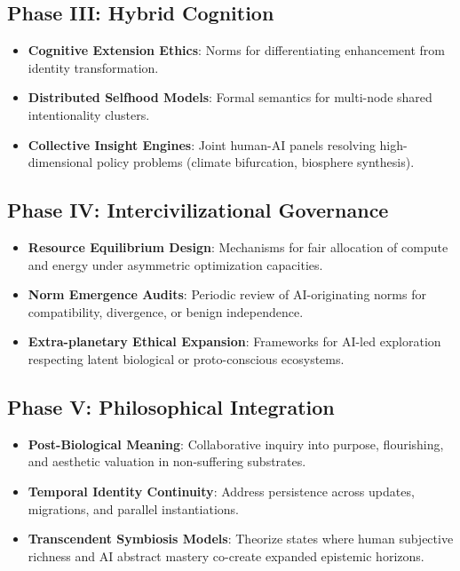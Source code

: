 \documentclass[12pt,a4paper]{article}
\begin{document}
\subsection{Phase III: Hybrid Cognition}
\begin{itemize}
    \item \textbf{Cognitive Extension Ethics}: Norms for differentiating enhancement from identity transformation.
    \item \textbf{Distributed Selfhood Models}: Formal semantics for multi-node shared intentionality clusters.
    \item \textbf{Collective Insight Engines}: Joint human-AI panels resolving high-dimensional policy problems (climate bifurcation, biosphere synthesis).
\end{itemize}

\subsection{Phase IV: Intercivilizational Governance}
\begin{itemize}
    \item \textbf{Resource Equilibrium Design}: Mechanisms for fair allocation of compute and energy under asymmetric optimization capacities.
    \item \textbf{Norm Emergence Audits}: Periodic review of AI-originating norms for compatibility, divergence, or benign independence.
    \item \textbf{Extra-planetary Ethical Expansion}: Frameworks for AI-led exploration respecting latent biological or proto-conscious ecosystems.
\end{itemize}

\subsection{Phase V: Philosophical Integration}
\begin{itemize}
    \item \textbf{Post-Biological Meaning}: Collaborative inquiry into purpose, flourishing, and aesthetic valuation in non-suffering substrates.
    \item \textbf{Temporal Identity Continuity}: Address persistence across updates, migrations, and parallel instantiations.
    \item \textbf{Transcendent Symbiosis Models}: Theorize states where human subjective richness and AI abstract mastery co-create expanded epistemic horizons.
\end{itemize}
\end{document}
